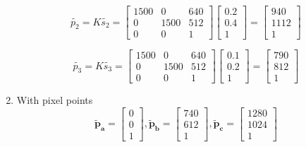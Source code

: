 \documentclass[12pt, letterpaper]{article}
\begin{document}
\begin{enumerate}
        \begin{equation*}
            {\tilde{p_2}=K\tilde{s_2}}=
            \begin{bmatrix}
                1500 & 0 & 640\\
                0 & 1500 & 512\\
                0 & 0 & 1
            \end{bmatrix}
            \begin{bmatrix}
                0.2\\
                0.4\\
                1
            \end{bmatrix}=
            \begin{bmatrix}
                940\\
                1112\\
                1
            \end{bmatrix}
        \end{equation*}

        \begin{equation*}
            {\tilde{p_3}=K\tilde{s_3}}=
            \begin{bmatrix}
                1500 & 0 & 640\\
                0 & 1500 & 512\\
                0 & 0 & 1
            \end{bmatrix}
            \begin{bmatrix}
                0.1\\
                0.2\\
                1
            \end{bmatrix}=
            \begin{bmatrix}
                790\\
                812\\
                1
            \end{bmatrix}
        \end{equation*}

    \item With pixel points
        \begin{equation*}
            \bm{\tilde{p}_a}=\begin{bmatrix}
                0\\
                0\\
                1
            \end{bmatrix},
            \bm{\tilde{p}_b}=\begin{bmatrix}
                740\\
                612\\
                1
            \end{bmatrix},
            \bm{\tilde{p}_c}=\begin{bmatrix}
                1280\\
                1024\\
                1
            \end{bmatrix}
        \end{equation*}


\end{enumerate}
\end{document}
